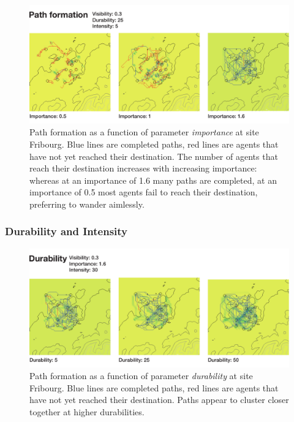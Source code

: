 \documentclass[a4paper, DIV11, abstracton]{scrartcl}
\begin{document}
\begin{figure}[tbp]
	\includegraphics[width=\linewidth]{../figures/importance}
	\caption{Path formation as a function of parameter \emph{importance} at site Fribourg. Blue lines are completed paths, red lines are agents that have not yet reached their destination. The number of agents that reach their destination increases with increasing importance: whereas at an importance of 1.6 many paths are completed, at an importance of 0.5 most agents fail to reach their destination, preferring to wander aimlessly.}
	\label{fig:importance}
\end{figure}


\subsubsection{Durability and Intensity}

\begin{figure}[tbp]
	\includegraphics[width=\linewidth]{../figures/durability1}
	\caption{Path formation as a function of parameter \emph{durability} at site Fribourg. Blue lines are completed paths, red lines are agents that have not yet reached their destination. Paths appear to cluster closer together at higher durabilities.}
	\label{fig:durability1}
\end{figure}
\end{document}
